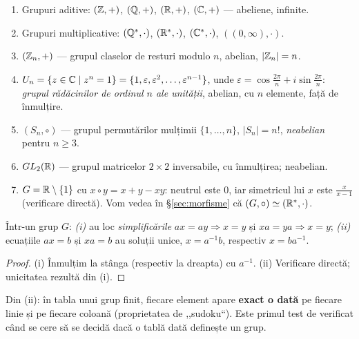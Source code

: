 \begin{exemplu}\label{ex:grupuri}
\begin{enumerate}[label=(\alph*),nosep]
\item Grupuri aditive: $(\mathbb{Z},+)$, $(\mathbb{Q},+)$, $(\mathbb{R},+)$, $(\mathbb{C},+)$ --- abeliene, infinite.
\item Grupuri multiplicative: $(\mathbb{Q}^*,\cdot)$, $(\mathbb{R}^*,\cdot)$, $(\mathbb{C}^*,\cdot)$, $((0,\infty),\cdot)$.
\item $(\mathbb{Z}_n,+)$ --- grupul claselor de resturi modulo $n$, abelian, $|\mathbb{Z}_n|=n$.
\item $U_n=\{z\in\mathbb{C}\mid z^n=1\}=\{1,\varepsilon,\varepsilon^2,\dots,\varepsilon^{n-1}\}$, unde $\varepsilon=\cos\frac{2\pi}{n}+i\sin\frac{2\pi}{n}$: \emph{grupul rădăcinilor de ordinul $n$ ale unității}, abelian, cu $n$ elemente, față de înmulțire.
\item $(S_n,\circ)$ --- grupul permutărilor mulțimii $\{1,\dots,n\}$, $|S_n|=n!$, \emph{neabelian} pentru $n\ge 3$.
\item $GL_2(\mathbb{R})$ --- grupul matricelor $2\times 2$ inversabile, cu înmulțirea; neabelian.
\item $G=\mathbb{R}\setminus\{1\}$ cu $x\circ y=x+y-xy$: neutrul este $0$, iar simetricul lui $x$ este $\frac{x}{x-1}$ (verificare directă). Vom vedea în §\ref{sec:morfisme} că $(G,\circ)\simeq(\mathbb{R}^*,\cdot)$.
\end{enumerate}
\end{exemplu}

\begin{propozitie}\label{prop:simplificare}
Într-un grup $G$: \emph{(i)} au loc \emph{simplificările} $ax=ay\Rightarrow x=y$ și $xa=ya\Rightarrow x=y$; \emph{(ii)} ecuațiile $ax=b$ și $xa=b$ au soluții unice, $x=a^{-1}b$, respectiv $x=ba^{-1}$.
\end{propozitie}

\begin{proof}
(i) Înmulțim la stânga (respectiv la dreapta) cu $a^{-1}$. (ii) Verificare directă; unicitatea rezultă din (i).
\end{proof}

\begin{observatie}
Din (ii): în tabla unui grup finit, fiecare element apare \textbf{exact o dată} pe fiecare linie și pe fiecare coloană (proprietatea de ,,sudoku``). Este primul test de verificat când se cere să se decidă dacă o tablă dată definește un grup.
\end{observatie}


